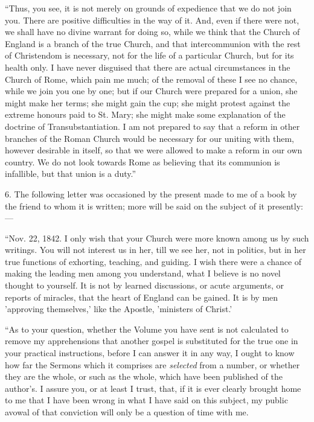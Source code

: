 ``Thus, you see, it is not merely on grounds of expedience
that we do not join you. There are positive difficulties in the way of
it. And, even if there were not, we shall have no divine warrant for
doing so, while we think that the Church of England is a branch of the
true Church, and that intercommunion with the rest of Christendom is
necessary, not for the life of a particular Church, but for its health
only. I have never disguised that there are actual circumstances in the
Church of Rome, which pain me much; of the removal of these I see no
chance, while we join you one by one; but if our Church were prepared
for a union, she might make her terms; she might gain the cup; she might
protest against the extreme honours paid to St. Mary; she might make
some explanation of the doctrine of Transubstantiation. I am not
prepared to say that a reform in other branches of the Roman Church
would be necessary for our uniting with them, however desirable in
itself, so that we were allowed to make a reform in our own country. We
do not look towards Rome as believing that its communion is infallible,
but that union is a duty.''

6. The following letter was occasioned by the present made to me of a
book by the friend to whom it is
written; more will be said on the subject of it presently:—

``Nov. 22, 1842. I only wish that your Church were more known
among us by such writings. You will not interest us in her, till we see
her, not in politics, but in her true functions of exhorting, teaching,
and guiding. I wish there were a chance of making the leading men among
you understand, what I believe is no novel thought to yourself. It is
not by learned discussions, or acute arguments, or reports of miracles,
that the heart of England can be gained. It is by men 'approving
themselves,' like the Apostle, 'ministers of Christ.'

``As to your question, whether the Volume you have sent is not
calculated to remove my apprehensions that another gospel is substituted
for the true one in your practical instructions, before I can answer it
in any way, I ought to know how far the Sermons which it comprises are \emph{selected} from a number, or whether they are the whole, or such as the
whole, which have been published of the author's. I assure you, or
at least I trust, that, if it is ever clearly brought home to me that I
have been wrong in what I have said on this subject, my public avowal of
that conviction will only be a question of time with me.

